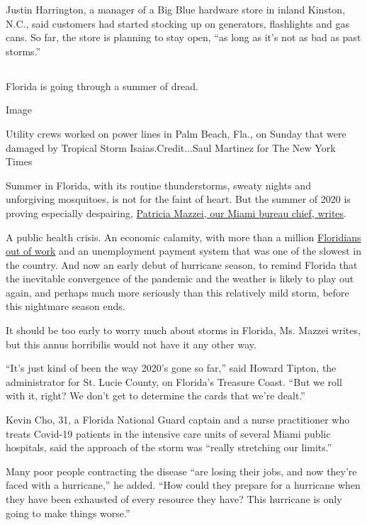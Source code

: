 Justin Harrington, a manager of a Big Blue hardware store in inland
Kinston, N.C., said customers had started stocking up on generators,
flashlights and gas cans. So far, the store is planning to stay open,
``as long as it's not as bad as past storms.''

\hypertarget{-5}{%
\subsection{}\label{-5}}

Florida is going through a summer of dread.

Image

Utility crews worked on power lines in Palm Beach, Fla., on Sunday that
were damaged by Tropical Storm Isaias.Credit...Saul Martinez for The New
York Times

Summer in Florida, with its routine thunderstorms, sweaty nights and
unforgiving mosquitoes, is not for the faint of heart. But the summer of
2020 is proving especially despairing,
\href{https://www.nytimes3xbfgragh.onion/2020/08/02/us/florida-hurricane-isaias-coronavirus.html}{Patricia
Mazzei, our Miami bureau chief, writes}.

A public health crisis. An economic calamity, with more than a million
\href{https://www.nytimes3xbfgragh.onion/2020/04/23/us/florida-coronavirus-unemployment.html}{Floridians
out of work} and an unemployment payment system that was one of the
slowest in the country. And now an early debut of hurricane season, to
remind Florida that the inevitable convergence of the pandemic and the
weather is likely to play out again, and perhaps much more seriously
than this relatively mild storm, before this nightmare season ends.

It should be too early to worry much about storms in Florida, Ms. Mazzei
writes, but this annus horribilis would not have it any other way.

``It's just kind of been the way 2020's gone so far,'' said Howard
Tipton, the administrator for St. Lucie County, on Florida's Treasure
Coast. ``But we roll with it, right? We don't get to determine the cards
that we're dealt.''

Kevin Cho, 31, a Florida National Guard captain and a nurse practitioner
who treats Covid-19 patients in the intensive care units of several
Miami public hospitals, said the approach of the storm was ``really
stretching our limits.''

Many poor people contracting the disease ``are losing their jobs, and
now they're faced with a hurricane,'' he added. ``How could they prepare
for a hurricane when they have been exhausted of every resource they
have? This hurricane is only going to make things worse.''

